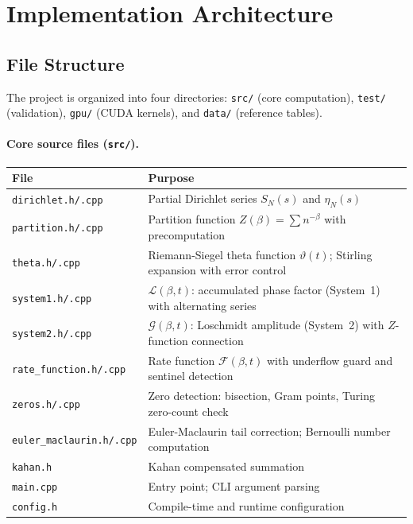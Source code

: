 \section{Implementation Architecture}
\label{sec:architecture}

\subsection{File Structure}
\label{sec:files}

The project is organized into four directories: \texttt{src/} (core computation),
\texttt{test/} (validation), \texttt{gpu/} (CUDA kernels), and \texttt{data/}
(reference tables).

\paragraph{Core source files (\texttt{src/}).}

\begin{longtable}{@{}p{4.2cm}p{8.5cm}@{}}
\toprule
\textbf{File} & \textbf{Purpose} \\
\midrule
\endhead
\texttt{dirichlet.h/.cpp}      & Partial Dirichlet series $S_N(s)$ and $\eta_N(s)$ \\
\texttt{partition.h/.cpp}      & Partition function $Z(\beta) = \sum n^{-\beta}$ with precomputation \\
\texttt{theta.h/.cpp}          & Riemann-Siegel theta function $\vartheta(t)$; Stirling expansion with error control \\
\texttt{system1.h/.cpp}        & $\mathcal{L}(\beta,t)$: accumulated phase factor (System~1) with alternating series \\
\texttt{system2.h/.cpp}        & $\mathcal{G}(\beta,t)$: Loschmidt amplitude (System~2) with $Z$-function connection \\
\texttt{rate\_function.h/.cpp} & Rate function $\mathcal{F}(\beta,t)$ with underflow guard and sentinel detection \\
\texttt{zeros.h/.cpp}          & Zero detection: bisection, Gram points, Turing zero-count check \\
\texttt{euler\_maclaurin.h/.cpp} & Euler-Maclaurin tail correction; Bernoulli number computation \\
\texttt{kahan.h}               & Kahan compensated summation \\
\texttt{main.cpp}              & Entry point; CLI argument parsing \\
\texttt{config.h}              & Compile-time and runtime configuration \\
\bottomrule
\end{longtable}

